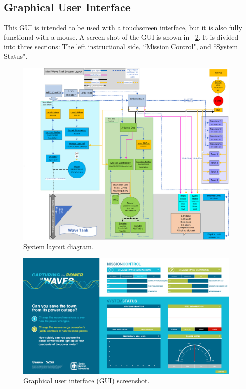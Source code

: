 \documentclass[11pt, letterpaper]{article}
\begin{document}
\subsection{Graphical User Interface}
This GUI is intended to be used with a touchscreen interface, but it is also fully functional with a mouse.
A screen shot of the GUI is shown in \figurename~\ref{fig:siweed_guiScreenShot}.
It is divided into three sections: The left instructional side, ``Mission Control", and ``System Status".

\begin{figure}[tb]
  \centering
  \includegraphics[width=1\textwidth]{diagrams/SystemLayout.png}
  \caption{System layout diagram.}
  \label{fig:siweed_layout}
\end{figure}
\begin{figure}[tb]
  \centering
  \includegraphics[width=1\textwidth]{diagrams/siweed_guiScreenShot.png}
  \caption{Graphical user interface (GUI) screenshot.}
  \label{fig:siweed_guiScreenShot}
\end{figure}
\end{document}
